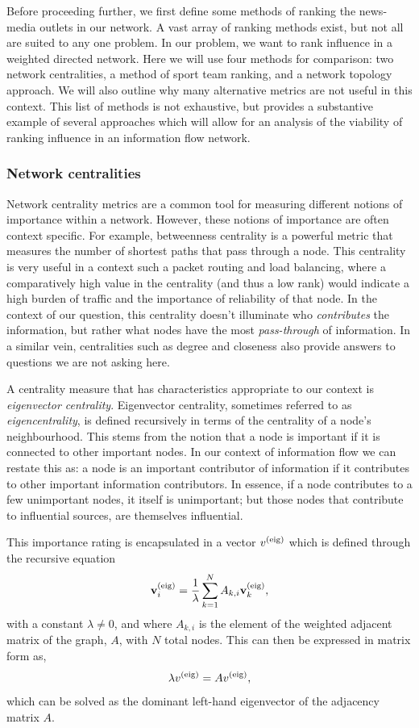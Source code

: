 Before proceeding further, we first define some methods of ranking the news-media outlets in our network. A vast array of ranking methods exist, but not all are suited to any one problem. In our problem, we want to rank influence in a weighted directed network. Here we will use four methods for comparison: two network centralities, a method of sport team ranking, and a network topology approach. We will also outline why many alternative metrics are not useful in this context. This list of methods is not exhaustive, but provides a substantive example of several approaches which will allow for an analysis of the viability of ranking influence in an information flow network. 

\subsubsection{Network centralities}

Network centrality metrics are a common tool for measuring different notions of importance within a network. However, these notions of importance are often context specific. For example, betweenness centrality is a powerful metric that measures the number of shortest paths that pass through a node. This centrality is very useful in a context such a packet routing and load balancing, where a comparatively high value in the centrality (and thus a low rank) would indicate a high burden of traffic and the importance of reliability of that node. In the context of our question, this centrality doesn't illuminate who \emph{contributes} the information, but rather what nodes have the most \emph{pass-through} of information. In a similar vein, centralities such as degree and closeness also provide answers to questions we are not asking here.

A centrality measure that has characteristics appropriate to our context is \emph{eigenvector centrality}. Eigenvector centrality, sometimes referred to as \emph{eigencentrality}, is defined recursively in terms of the centrality of a node's neighbourhood. This stems from the notion that a node is important if it is connected to other important nodes. In our context of information flow we can restate this as: a node is an important contributor of information if it contributes to other important information contributors. In essence, if a node contributes to a few unimportant nodes, it itself is unimportant; but those nodes that contribute to influential sources, are themselves influential.

This importance rating is encapsulated in a vector $v^{\rm(eig)}$ which is defined through the recursive equation
\begin{equation}\label{eq:eigenvector}
\textbf{v}_{i}^{\rm(eig)}=\frac{1}{\lambda} \sum_{k=1}^{N} A_{k, i} \textbf{v}_{k}^{\rm(eig)},
\end{equation}
with a constant $\lambda \neq 0$, and where $A_{k, i}$ is the element of the weighted adjacent matrix of the graph, $A$, with $N$ total nodes. This can then be expressed in matrix form as,
\begin{equation}
\lambda v^{\rm(eig)} = A v^{\rm(eig)}, 
\end{equation}
which can be solved as the dominant left-hand eigenvector of the adjacency matrix $A$. 

